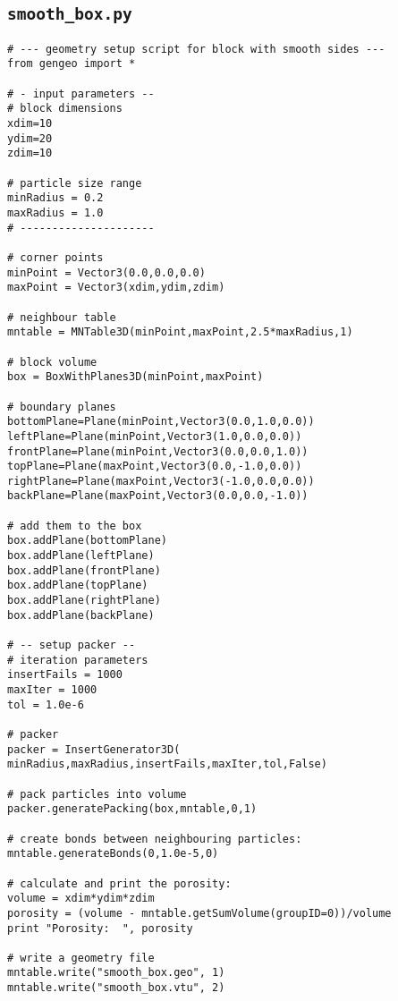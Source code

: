 \subsection{\texttt{smooth\_box.py}}\label{geocode:smooth_box}

\begin{verbatim}
# --- geometry setup script for block with smooth sides ---
from gengeo import *

# - input parameters --
# block dimensions
xdim=10
ydim=20
zdim=10

# particle size range
minRadius = 0.2
maxRadius = 1.0
# ---------------------

# corner points
minPoint = Vector3(0.0,0.0,0.0)
maxPoint = Vector3(xdim,ydim,zdim)

# neighbour table 
mntable = MNTable3D(minPoint,maxPoint,2.5*maxRadius,1)

# block volume
box = BoxWithPlanes3D(minPoint,maxPoint)

# boundary planes
bottomPlane=Plane(minPoint,Vector3(0.0,1.0,0.0))
leftPlane=Plane(minPoint,Vector3(1.0,0.0,0.0))
frontPlane=Plane(minPoint,Vector3(0.0,0.0,1.0))
topPlane=Plane(maxPoint,Vector3(0.0,-1.0,0.0))
rightPlane=Plane(maxPoint,Vector3(-1.0,0.0,0.0))
backPlane=Plane(maxPoint,Vector3(0.0,0.0,-1.0))

# add them to the box 
box.addPlane(bottomPlane)
box.addPlane(leftPlane)
box.addPlane(frontPlane)
box.addPlane(topPlane)
box.addPlane(rightPlane)
box.addPlane(backPlane)

# -- setup packer --
# iteration parameters
insertFails = 1000
maxIter = 1000
tol = 1.0e-6

# packer
packer = InsertGenerator3D( minRadius,maxRadius,insertFails,maxIter,tol,False)

# pack particles into volume
packer.generatePacking(box,mntable,0,1)

# create bonds between neighbouring particles:
mntable.generateBonds(0,1.0e-5,0)

# calculate and print the porosity:
volume = xdim*ydim*zdim
porosity = (volume - mntable.getSumVolume(groupID=0))/volume
print "Porosity:  ", porosity

# write a geometry file
mntable.write("smooth_box.geo", 1)
mntable.write("smooth_box.vtu", 2)
\end{verbatim}